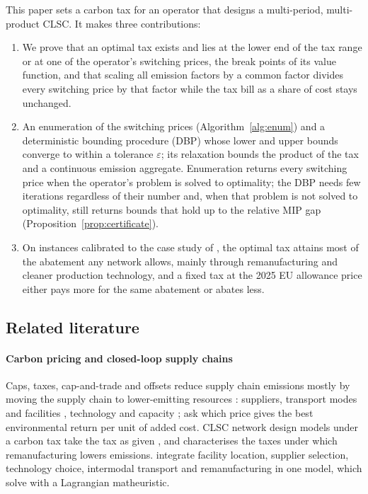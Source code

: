 \documentclass[review,11pt,nonatbib]{elsarticle}
\theoremstyle{remark}
\begin{document}
This paper sets a carbon tax for an operator that designs a multi-period, multi-product CLSC. It makes three contributions:
\begin{enumerate}
\item We prove that an optimal tax exists and lies at the lower end of the tax range or at one of the operator's switching prices, the break points of its value function, and that scaling all emission factors by a common factor divides every switching price by that factor while the tax bill as a share of cost stays unchanged.
\item An enumeration of the switching prices (Algorithm~\ref{alg:enum}) and a deterministic bounding procedure (DBP) whose lower and upper bounds converge to within a tolerance $\varepsilon$; its relaxation bounds the product of the tax and a continuous emission aggregate. Enumeration returns every switching price when the operator's problem is solved to optimality; the DBP needs few iterations regardless of their number and, when that problem is not solved to optimality, still returns bounds that hold up to the relative MIP gap (Proposition~\ref{prop:certificate}).
\item On instances calibrated to the case study of \textcite{mota2018sustainable}, the optimal tax attains most of the abatement any network allows, mainly through remanufacturing and cleaner production technology, and a fixed tax at the 2025 EU allowance price either pays more for the same abatement or abates less.
\end{enumerate}

\subsection{Related literature}\label{sec:literature}

\paragraph{Carbon pricing and closed-loop supply chains} Caps, taxes, cap-and-trade and offsets reduce supply chain emissions mostly by moving the supply chain to lower-emitting resources \parencite{waltho2019green}: suppliers, transport modes and facilities \parencite{palak2014analyzing,marufuzzaman2014environmentally}, technology and capacity \parencite{drake2016technology}; \textcite{fahimnia2015tactical} ask which price gives the best environmental return per unit of added cost. CLSC network design models under a carbon tax take the tax as given \parencite{haddadsisakht2018closed,govindan2023location}, and \textcite{yenipazarli2016managing} characterises the taxes under which remanufacturing lowers emissions. \textcite{mota2018sustainable} integrate facility location, supplier selection, technology choice, intermodal transport and remanufacturing in one model, which \textcite{tautenhain2021efficient} solve with a Lagrangian matheuristic.
\end{document}

